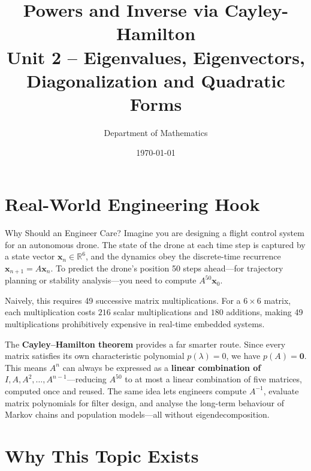 \documentclass[12pt,a4paper]{article}
\title{\textbf{Powers and Inverse via Cayley-Hamilton} \\ \large Unit 2 -- Eigenvalues, Eigenvectors, Diagonalization and Quadratic Forms}
\author{Department of Mathematics}
\date{\today}
\begin{document}
\maketitle
\tableofcontents
\newpage

\section{Real-World Engineering Hook}

\begin{curiositybox}{Why Should an Engineer Care?}
Imagine you are designing a flight control system for an autonomous drone. The state of the drone at each time step is captured by a state vector \(\mathbf{x}_n \in \mathbb{R}^6\), and the dynamics obey the discrete-time recurrence \(\mathbf{x}_{n+1} = A\mathbf{x}_n\). To predict the drone's position 50 steps ahead---for trajectory planning or stability analysis---you need to compute \(A^{50}\mathbf{x}_0\).

Naively, this requires 49 successive matrix multiplications. For a \(6 \times 6\) matrix, each multiplication costs \(216\) scalar multiplications and \(180\) additions, making 49 multiplications prohibitively expensive in real-time embedded systems.

The \textbf{Cayley--Hamilton theorem} provides a far smarter route. Since every matrix satisfies its own characteristic polynomial \(p(\lambda) = 0\), we have \(p(A) = \mathbf{0}\). This means \(A^n\) can always be expressed as a \textbf{linear combination of} \(I, A, A^2, \ldots, A^{n-1}\)---reducing \(A^{50}\) to at most a linear combination of five matrices, computed once and reused. The same idea lets engineers compute \(A^{-1}\), evaluate matrix polynomials for filter design, and analyse the long-term behaviour of Markov chains and population models---all without eigendecomposition.
\end{curiositybox}

\section{Why This Topic Exists}
\end{document}
